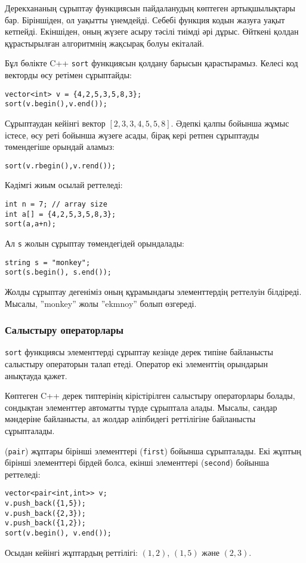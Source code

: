Дерекхананың сұрыптау функциясын пайдаланудың
көптеген артықшылықтары бар.
Біріншіден, ол уақытты үнемдейді. Себебі функция кодын жазуға уақыт кетпейді.
Екіншіден, оның жүзеге асыру тәсілі тиімді әрі дұрыс. Өйткені қолдан құрастырылған алгоритмнің жақсырақ болуы екіталай.

Бұл бөлікте C++ \texttt{sort} функциясын 
қолдану барысын қарастырамыз.
Келесі код векторды өсу ретімен сұрыптайды:
\begin{lstlisting}
vector<int> v = {4,2,5,3,5,8,3};
sort(v.begin(),v.end());
\end{lstlisting}
Сұрыптаудан кейінгі вектор
$[2,3,3,4,5,5,8]$.
Әдепкі қалпы бойынша жұмыс істесе, өсу реті бойынша жүзеге асады,
бірақ кері ретпен сұрыптауды төмендегіше орындай аламыз:
\begin{lstlisting}
sort(v.rbegin(),v.rend());
\end{lstlisting}
Кәдімгі жиым осылай реттеледі:
\begin{lstlisting}
int n = 7; // array size
int a[] = {4,2,5,3,5,8,3};
sort(a,a+n);
\end{lstlisting}

Ал \texttt{s} жолын сұрыптау төмендегідей орындалады:
\begin{lstlisting}
string s = "monkey";
sort(s.begin(), s.end());
\end{lstlisting}
Жолды сұрыптау дегеніміз оның құрамындағы 
элементтердің реттелуін білдіреді.
Мысалы, ''monkey'' жолы ''ekmnoy'' болып өзгереді.

\subsubsection{Салыстыру операторлары}


\texttt{sort} функциясы элементтерді сұрыптау кезінде
дерек типіне байланысты салыстыру  операторын талап етеді.
Оператор екі элементтің орындарын анықтауда қажет.

Көптеген C++ дерек типтерінің кірістірілген
салыстыру операторлары болады, сондықтан элементтер 
автоматты түрде сұрыптала алады.
Мысалы, сандар мәндеріне байланысты, ал жолдар әліпбидегі
реттілігіне байланысты сұрыпталады.


(\texttt{pair}) жұптары бірінші элементтері 
(\texttt{first}) бойынша сұрыпталады.
Екі жұптың бірінші элементтері бірдей болса, екінші элементтері 
(\texttt{second}) бойынша реттеледі:
\begin{lstlisting}
vector<pair<int,int>> v;
v.push_back({1,5});
v.push_back({2,3});
v.push_back({1,2});
sort(v.begin(), v.end());
\end{lstlisting}
Осыдан кейінгі жұптардың реттілігі:
$(1,2)$, $(1,5)$ және $(2,3)$.

